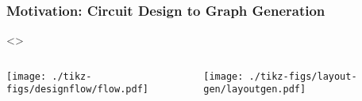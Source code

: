 \documentclass[./presentation.tex]{subfiles}
\begin{document}
\begin{frame}[label=flows1,t]
  \frametitle{Motivation: Circuit Design to Graph Generation}
  \centering
  \resetmfrc{}
\only<\mfrc{}>{
\begin{columns}
  \begin{column}{0.5\textwidth}
    \texttt{[image: ./tikz-figs/designflow/flow.pdf]}
  \end{column}
  \begin{column}{0.5\textwidth}
    \texttt{[image: ./tikz-figs/layout-gen/layoutgen.pdf]}
  \end{column}
\end{columns}
}
\end{frame}
\end{document}
